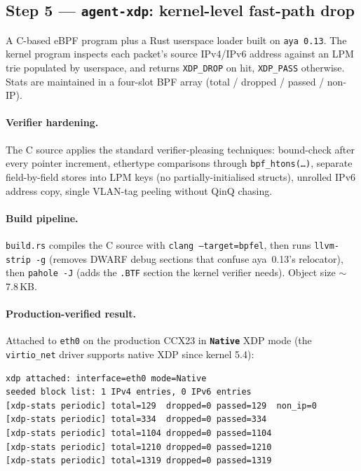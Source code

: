 \documentclass[11pt,a4paper]{article}
\begin{document}
\subsection{Step 5 --- \texttt{agent-xdp}: kernel-level fast-path drop}

A C-based eBPF program plus a Rust userspace loader built on
\texttt{aya 0.13}.  The kernel program inspects each packet's
source IPv4/IPv6 address against an LPM trie populated by userspace,
and returns \texttt{XDP\_DROP} on hit, \texttt{XDP\_PASS} otherwise.
Stats are maintained in a four-slot BPF array
(total / dropped / passed / non-IP).

\paragraph{Verifier hardening.}
The C source applies the standard verifier-pleasing techniques:
bound-check after every pointer increment, ethertype comparisons
through \texttt{bpf\_htons(\ldots)}, separate field-by-field stores
into LPM keys (no partially-initialised structs), unrolled IPv6
address copy, single VLAN-tag peeling without QinQ chasing.

\paragraph{Build pipeline.}
\texttt{build.rs} compiles the C source with
\texttt{clang --target=bpfel}, then runs
\texttt{llvm-strip -g} (removes DWARF debug sections that confuse
aya~0.13's relocator), then \texttt{pahole -J} (adds the
\texttt{.BTF} section the kernel verifier needs).  Object size
$\sim$7.8\,KB.

\paragraph{Production-verified result.}
Attached to \texttt{eth0} on the production CCX23 in
\textbf{\texttt{Native}} XDP mode (the \texttt{virtio\_net} driver
supports native XDP since kernel 5.4):

\begin{lstlisting}
xdp attached: interface=eth0 mode=Native
seeded block list: 1 IPv4 entries, 0 IPv6 entries
[xdp-stats periodic] total=129  dropped=0 passed=129  non_ip=0
[xdp-stats periodic] total=334  dropped=0 passed=334
[xdp-stats periodic] total=1104 dropped=0 passed=1104
[xdp-stats periodic] total=1210 dropped=0 passed=1210
[xdp-stats periodic] total=1319 dropped=0 passed=1319
\end{lstlisting}
\end{document}
